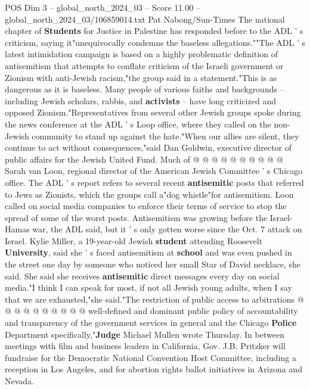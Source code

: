 \begin{textsample}{POS Dim 3 – global\_north\_2024\_03 – Score 11.00 – global\_north\_2024\_03/106859014.txt}
Pat Nabong/Sun-Times The national chapter of \textbf{Students} for Justice in Palestine has responded before to the ADL ' s criticism, saying it"unequivocally condemns the baseless allegations.""The ADL ' s latest intimidation campaign is based on a highly problematic definition of antisemitism that attempts to conflate criticism of the Israeli government or Zionism with anti-Jewish racism,"the group said in a statement."This is as dangerous as it is baseless.
Many people of various faiths and backgrounds -- including Jewish scholars, rabbis, and \textbf{activists} -- have long criticized and opposed Zionism."Representatives from several other Jewish groups spoke during the news conference at the ADL ' s Loop office, where they called on the non-Jewish community to stand up against the hate."When our allies are silent, they continue to act without consequences,"said Dan Goldwin, executive director of public affairs for the Jewish United Fund.
Much of @ @ @ @ @ @ @ @ @ @ Sarah van Loon, regional director of the American Jewish Committee ' s Chicago office.
The ADL ' s report refers to several recent \textbf{antisemitic} posts that referred to Jews as Zionists, which the groups call a"dog whistle"for antisemitism.
Loon called on social media companies to enforce their terms of service to stop the spread of some of the worst posts.
Antisemitism was growing before the Israel-Hamas war, the ADL said, but it ' s only gotten worse since the Oct. 7 attack on Israel.
Kylie Miller, a 19-year-old Jewish \textbf{student} attending Roosevelt \textbf{University}, said she ' s faced antisemitism at \textbf{school} and was even pushed in the street one day by someone who noticed her small Star of David necklace, she said.
She said she receives \textbf{antisemitic} direct messages every day on social media."I think I can speak for most, if not all Jewish young adults, when I say that we are exhausted,"she said."The restriction of public access to arbitrations @ @ @ @ @ @ @ @ @ @ well-defined and dominant public policy of accountability and transparency of the government services in general and the Chicago \textbf{Police} Department specifically,"\textbf{Judge} Michael Mullen wrote Thursday.
In between meetings with film and business leaders in California, Gov.
J.B.
Pritzker will fundraise for the Democratic National Convention Host Committee, including a reception in Los Angeles, and for abortion rights ballot initiatives in Arizona and Nevada.

\end{textsample}
